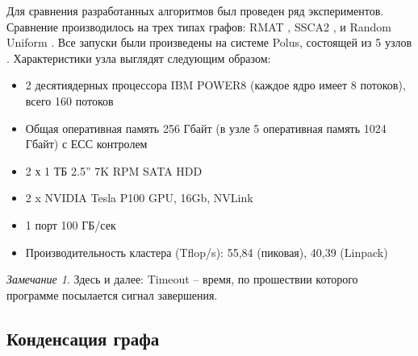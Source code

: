 \documentclass[12pt,a4paper,oneside,openany]{article}
\theoremstyle{definition}
\theoremstyle{lemma}
\theoremstyle{remark}
\newtheorem{remark}{Замечание}[]
\begin{document}
Для сравнения разработанных алгоритмов был проведен ряд экспериментов.
Сравнение производилось на трех типах графов: RMAT \cite{chakrabarti2004rmat}, SSCA2 \cite{bader2005ssca}, и Random Uniform \cite{erdos1959ur}.
Все запуски были произведены на системе Polus, состоящей из 5 узлов \cite{polus}.
Характеристики узла выглядят следующим образом:
\begin{itemize}
\item 2 десятиядерных процессора IBM POWER8 (каждое ядро имеет 8 потоков), всего 160 потоков
\item Общая оперативная память 256 Гбайт (в узле 5 оперативная память 1024 Гбайт) с ЕСС контролем
\item 2 х 1 ТБ 2.5” 7K RPM SATA HDD
\item 2 x NVIDIA Tesla P100 GPU, 16Gb, NVLink
\item 1 порт 100 ГБ/сек
\item Производительность кластера (Tflop/s): 55,84 (пиковая), 40,39 (Linpack)
\end{itemize}

\begin{remark}
    Здесь и далее: Timeout -- время, по прошествии которого программе посылается сигнал завершения.
\end{remark}

\subsection{Конденсация графа}\label{subsec:condensationresults}
\end{document}
